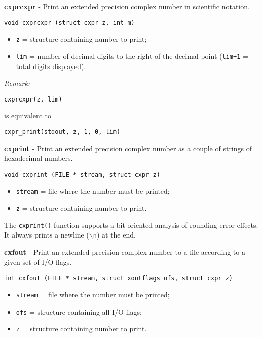 \documentclass{article}
\begin{document}
\hrulefill{}

\textbf{cxprcxpr} - Print an extended precision complex number
in scientific notation.

\begin{verbatim}
void cxprcxpr (struct cxpr z, int m)
\end{verbatim}

\begin{itemize}
\item \texttt{z}   = structure containing number to print;
\item \texttt{lim} = number of decimal digits to the right of the
decimal point (\texttt{lim+1} = total digits displayed).
\end{itemize}

\textit{Remark:}

\begin{verbatim}
cxprcxpr(z, lim)
\end{verbatim}
is equivalent to  

\begin{verbatim}
cxpr_print(stdout, z, 1, 0, lim)
\end{verbatim}

\hrulefill{}

\textbf{cxprint} - Print an extended precision complex number as a couple
of strings of hexadecimal numbers.

\begin{verbatim}
void cxprint (FILE * stream, struct cxpr z)
\end{verbatim}

\begin{itemize}
\item \texttt{stream} = file where the number must be printed;
\item \texttt{z}      = structure containing number to print.
\end{itemize}

The \texttt{cxprint()} function supports a bit oriented analysis of
rounding error effects. It always prints a newline (\texttt{$\backslash$n})
at the end.


\hrulefill{}

\textbf{cxfout} - Print an extended precision complex number to a file 
according to a given set of I/O flags.

\begin{verbatim}
int cxfout (FILE * stream, struct xoutflags ofs, struct cxpr z)
\end{verbatim}

\begin{itemize}
\item \texttt{stream} = file where the number must be printed;
\item \texttt{ofs}    = structure containing all I/O flags;
\item \texttt{z}      = structure containing number to print.
\end{itemize}
\end{document}
